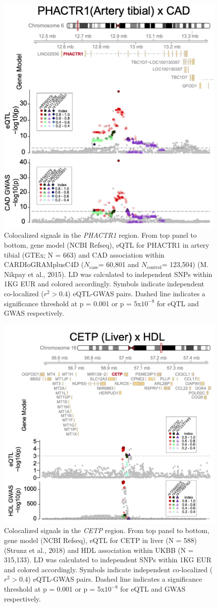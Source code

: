 \documentclass[11pt]{article}
\newcommand{\Ncase}{$N_{\textrm{case}}$\xspace}
\newcommand{\Ncontrol}{$N_{\textrm{control}}$\xspace}
\begin{document}
\begin{figure}[!ht]
  \centering
  \includegraphics[width=.7\textwidth]{figs/region_phactr1.jpg}
  \caption{Colocalized signals in the \emph{PHACTR1} region. From top
    panel to bottom, gene model (NCBI Refseq), eQTL for PHACTR1 in
    artery tibial (GTEx; N = 663) and CAD association within
    CARDIoGRAMplusC4D (\Ncase = 60,801 and \Ncontrol = 123,504)
    (M. Nikpay et al., 2015). LD was calculated to independent SNPs
    within 1KG EUR and colored accordingly. Symbols indicate
    independent co-localized ($r^2 > 0.4$) eQTL-GWAS pairs. Dashed
    line indicates a significance threshold at p = 0.001 or p =
    5x$10^{-8}$ for eQTL and GWAS respectively.} 
\end{figure}

\begin{figure}[!ht]
  \centering
  \includegraphics[width=.7\textwidth]{figs/region_cetp.jpg}
  \caption{Colocalized signals in the \emph{CETP} region. From top
    panel to bottom, gene model (NCBI Refseq), eQTL for CETP in liver
    (N = 588) (Strunz et al., 2018) and HDL association within UKBB (N
    = 315,133). LD was calculated to independent SNPs within 1KG EUR
    and colored accordingly. Symbols indicate independent co-localized
    ($r^2 > 0.4$) eQTL-GWAS pairs. Dashed line indicates a significance
    threshold at p = 0.001 or p = 5x$10^{-8}$ for eQTL and GWAS
    respectively.} 
\end{figure}
\end{document}
